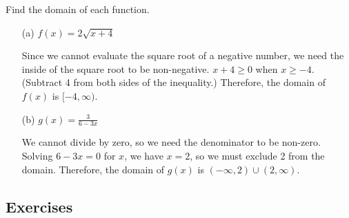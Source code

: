 \begin{example}
Find the domain of each function.
\begin{itemize}
    \item[(a)] $f(x) = 2\sqrt{x+4}$

    \begin{solution} Since we cannot evaluate the square root of a negative number, we need the inside of the square root to be non-negative. $x+4 \ge 0$ when $x \ge -4$. (Subtract 4 from both sides of the inequality.) Therefore, the domain of $f(x)$ is $[-4, \infty)$.
        \end{solution}
    \item[(b)] $g(x) = \frac{3}{6-3x}$

    \begin{solution} We cannot divide by zero, so we need the denominator to be non-zero. Solving $6-3x = 0$ for $x$, we have $x = 2$, so we must exclude 2 from the domain. Therefore, the domain of $g(x)$ is $(-\infty, 2)\cup(2, \infty)$.
        \end{solution}
\end{itemize}

\end{example}


\subsection{Exercises}
\label{1-2-exercises}

